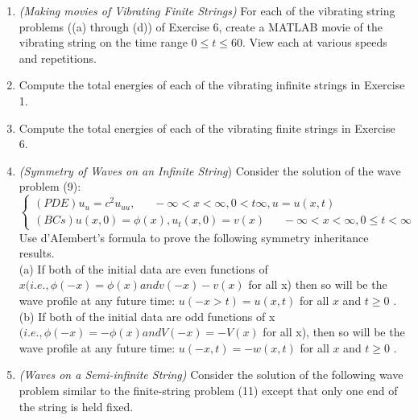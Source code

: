 \documentclass[../main.tex]{subfiles}
\begin{document}
{{\begin{enumerate}
$\phi(x)=
\begin{cases} 
	sin(x), for~~ 0\leqslant  x\leqslant 2 \pi \\
	0, ~~~~~~~otherwise
\end{cases}$, 
	$\begin{cases} 
		1, ~~for~~ 6\pi \leqslant x \leqslant 8\pi \\	
		0, ~~~~~~~~~~~~~~~otherwise
	\end{cases}
		L=10 \pi$.
\\
\\
Obtain snapshots for the time range $ \vartriangle \leqslant t \leqslant40$ in increments of $\vartriangle t=2$.
	\item
		 \textit{(Making movies of Vibrating Finite Strings)} For each of the vibrating string problems ((a) 
through (d)) of Exercise 6, create a MATLAB movie of the vibrating string on the time range 
$0 \leqslant t \leqslant 60$. View each at various speeds and repetitions.
	\item 
		Compute the total energies of each of the vibrating infinite strings in Exercise 1. 
		\item 
		Compute the total energies of each of the vibrating finite strings in Exercise 6.  
		\item 
		\textit{(Symmetry of Waves on an Infinite String}) Consider the solution of the wave problem (9): 
 $$\begin{cases} 
	(PDE) u_u=c^2 u_{uu}, ~~~~~~~ - \infty< x< \infty, 0<t \infty , u=u(x,t) \\ 
	(BCs) u(x,0)=\phi (x), u_t(x,0)=v(x) ~~~~~~~
	-\infty< x< \infty, 0\leqslant t< \infty 
\end{cases}$$
 Use d'AIembert's formula to prove the following symmetry inheritance results.
 \\ 
(a) If both of the initial data are even functions  of $x (i.e., \phi(-x) = \phi(x) and v(-x) - v(x)$ for 
all x) then so will be the wave profile at any future time: $u(-x>t) = u(x,t)$ for all $x$ and $t \geq 0$ . 
\\
(b) If both of the initial data are odd functions of x $(i.e., \phi(-x) = -\phi(x) and V(-x) = -V(x)$ for 
all x), then so will be the wave profile at any future time: $u(-x, t) = -w(x, t)$ for all $x$ and $t \geq 0$ .
\\ 
		\item 
		\textit{(Waves on a Semi-infinite String)} Consider the solution of the following wave problem similar 
to the finite-string problem (11) except that only one end of the string is held fixed. 

\end{enumerate}}}
\end{document}
